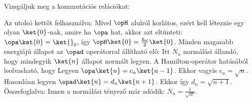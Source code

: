     Vizsgáljuk meg a kommutációs relációkat:
    
    Az utolsó kettőt felhasználva:
    Mivel $\opH$ alulról korlátos, ezért kell léteznie egy olyan $\ket{0}$-nak, amire ha $\opa$ hat, akkor azt eltünteti: $\opa\ket{0}=\ket{}_0$, így $\opH\ket{0}=\frac{\hbar\omega}{2}\ket{0}$.
   Minden magasabb energiájú állapot az $\opad$ operátorral állítható elő:
    Itt $N_n$ normálási állandó, hogy mindegyik $\ket{n}$ állapot normált legyen.
   A Hamilton-operátor hatásából leolvasható, hogy 
    Legyen $\opa\ket{n}=c_n\ket{n-1}$.
   Ekkor
    vagyis $c_n=\sqrt{n}$.
   Hasonlóan legyen $\opad\ket{n}=d_n\ket{n+1}$.
   Ekkor
    így $d_n=\sqrt{n+1}$. Összefoglalva:
    Innen a normálási tényező már adódik: $N_n=\frac{1}{\sqrt{n!}}$. 
    
